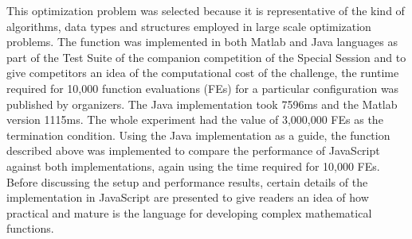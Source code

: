 \documentclass[journal,onecolumn]{IEEEtran}
\begin{document}
This optimization problem was selected because it is representative of the kind of
algorithms, data types and structures employed in large scale optimization problems. 
The function was implemented in both Matlab and Java languages as part of the
Test Suite of the companion competition of the Special Session and to give competitors an idea of the
computational cost of the challenge, the runtime required for 10,000 function 
evaluations (FEs) for a particular configuration was published by organizers. The Java
implementation took 7596ms and the Matlab version 1115ms. The whole experiment had the value of
3,000,000 FEs as the termination condition. Using the Java implementation as
a guide, the function described above was implemented to compare the performance of JavaScript against
both implementations, again using the time required for 10,000 FEs. 
Before discussing the setup and performance results, certain details of
the implementation in JavaScript are presented to give readers an idea of 
how practical and mature is the language for developing complex mathematical functions.
\end{document}
